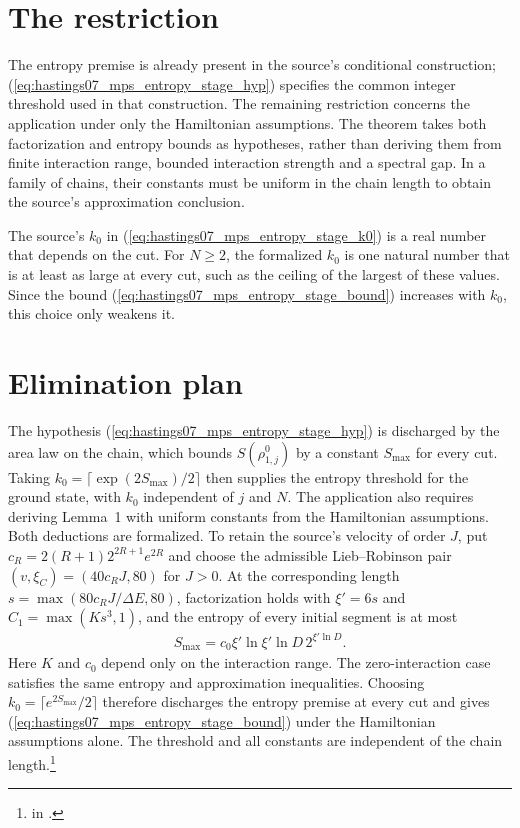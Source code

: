 \documentclass{article}
\begin{document}
\section{The restriction}

The entropy premise is already present in the source's conditional
construction; (\ref{eq:hastings07_mps_entropy_stage_hyp}) specifies the
common integer threshold used in that construction. The remaining
restriction concerns the application under only the Hamiltonian assumptions.
The theorem takes both factorization and entropy bounds as hypotheses,
rather than deriving them from finite interaction range, bounded interaction
strength and a spectral gap. In a family of chains, their constants must be
uniform in the chain length to obtain the source's approximation conclusion.

The source's $k_0$ in (\ref{eq:hastings07_mps_entropy_stage_k0}) is a real
number that depends on the cut. For $N\ge2$, the formalized $k_0$ is one natural number
that is at least as large at every cut, such as the ceiling of the largest of
these values. Since the bound (\ref{eq:hastings07_mps_entropy_stage_bound})
increases with $k_0$, this choice only weakens it.

\section{Elimination plan}

The hypothesis (\ref{eq:hastings07_mps_entropy_stage_hyp}) is discharged by
the area law on the chain, which bounds $S(\rho^0_{1,j})$ by a constant
$S_{\max}$ for every cut. Taking $k_0=\lceil\exp(2S_{\max})/2\rceil$ then
supplies the entropy threshold for the ground state, with $k_0$ independent of
$j$ and $N$. The application also requires deriving Lemma~1 with uniform
constants from the Hamiltonian assumptions.
Both deductions are formalized. To retain the source's velocity of
order $J$, put $c_R=2(R+1)2^{2R+1}e^{2R}$ and choose the admissible
Lieb--Robinson pair $(v,\xi_C)=(40c_RJ,80)$ for $J>0$. At the corresponding
length $s=\max(80c_RJ/\Delta E,80)$, factorization holds with
$\xi'=6s$ and $C_1=\max(Ks^3,1)$, and the entropy of every initial segment
is at most
\begin{align}
    S_{\max}=c_0\xi'\ln\xi'\ln D\,2^{\xi'\ln D}.
    \label{eq:hastings07_mps_entropy_source_max}
\end{align}
Here $K$ and $c_0$ depend only on the interaction range. The zero-interaction
case satisfies the same entropy and approximation inequalities. Choosing
$k_0=\lceil e^{2S_{\max}}/2\rceil$ therefore discharges the entropy premise
at every cut and gives (\ref{eq:hastings07_mps_entropy_stage_bound}) under
the Hamiltonian assumptions alone. The threshold and all constants are
independent of the chain length.\footnote{
    in .}
\end{document}
